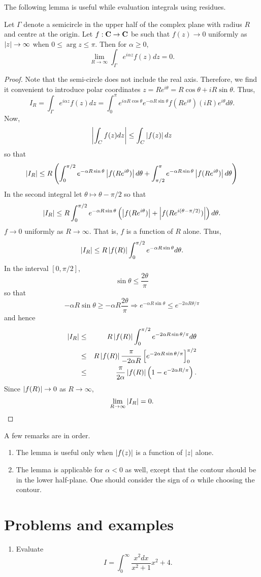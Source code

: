 The following lemma is useful while evaluation integrals using residues.
\begin{lem}\label{c5s3l1}
Let $\Gamma$ denote a semicircle in the upper half of the complex plane with
radius $R$ and centre at the origin. Let $f:\mathbf{C} \rightarrow \mathbf{C}$ be such that
$f(z) \rightarrow 0$ uniformly as $\left\vert{z}\right\vert \rightarrow \infty$ when $0 \le \arg{z} 
\le \pi$. Then for $\alpha \ge 0$,
\[
\lim_{R \rightarrow \infty}\int_\Gamma e^{i\alpha z}f(z)dz = 0.
\]
\end{lem}
\begin{proof}
Note that the semi-circle does not include the real axis. Therefore, we find it
convenient to introduce polar coordinates $z = Re^{i\theta} = R\cos\theta + iR
\sin\theta$. Thus,
\[
I_R = \int_\Gamma e^{i\alpha z}f(z)dz = \int_0^\pi e^{i\alpha R\cos\theta}
e^{-\alpha R\sin\theta}f(Re^{i\theta})(iR)e^{i\theta}d\theta.
\]
Now,
\[
\left\vert{\int_C f(z)dz}\right\vert \le \int_C\left\vert{f(z)}\right\vert dz
\]
so that
\[
\left\vert{I_R}\right\vert \le R\left(
\int_0^{\pi/2} e^{-\alpha R\sin\theta}\left\vert{f(Re^{i\theta})}\right\vert d\theta + 
\int_{\pi/2}^\pi e^{-\alpha R\sin\theta}\left\vert{f(Re^{i\theta})}\right\vert d\theta\right)
\] 
In the second integral let $\theta \mapsto \theta - \pi/2$ so that
\[
\left\vert{I_R}\right\vert \le R\int_0^{\pi/2} e^{-\alpha R\sin\theta}\left(\left\vert{f(Re^{i\theta})}\right\vert
+ \left\vert{f(Re^{i(\theta-\pi/2)})}\right\vert\right)d\theta.
\]
$f \rightarrow 0$ uniformly as $R \rightarrow \infty$. That is, $f$ is a 
function of $R$ alone. Thus,
\[
\left\vert{I_R}\right\vert \le R\left\vert{f(R)}\right\vert \int_0^{\pi/2} e^{-\alpha R\sin\theta} d\theta.
\]
In the interval $[0, \pi/2]$, 
\[
\sin\theta \le \frac{2\theta}{\pi}
\]
so that 
\[
-\alpha R\sin\theta \ge -\alpha R \frac{2\theta}{\pi} \Rightarrow
e^{-\alpha R\sin\theta} \le e^{-2\alpha R\theta/\pi}
\]
and hence
\begin{eqnarray*}
\left\vert{I_R}\right\vert &\le& R\left\vert{f(R)}\right\vert \int_0^{\pi/2} e^{-2\alpha R\sin\theta/\pi} d\theta \\
&\le& R\left\vert{f(R)}\right\vert\frac{\pi}{-2\alpha R} \left[e^{-2\alpha R\sin\theta/\pi}\right]_0^{\pi/2} \\
&\le& \frac{\pi}{2\alpha}\left\vert{f(R)}\right\vert\left(1 - e^{-2\alpha R/\pi}\right).
\end{eqnarray*}
Since $\left\vert{f(R)}\right\vert \rightarrow 0$ as $R \rightarrow \infty$,
\[
\lim_{R \rightarrow \infty}\left\vert{I_R}\right\vert = 0.
\]
\end{proof}

A few remarks are in order.
\begin{enumerate}
\item The lemma is useful only when $\left\vert{f(z)}\right\vert$ is a function of $\left\vert{z}\right\vert$ alone.
\item The lemma is applicable for $\alpha < 0$ as well, except that the contour
should be in the lower half-plane. One should consider the sign of $\alpha$ while
choosing the contour.
\end{enumerate}

\section{Problems and examples}\label{c5s4}
\begin{enumerate}
\item Evaluate
\[
I = \int_0^\infty \frac{x^2dx}{x^2 + 1}{x^2 + 4}.
\]
\end{enumerate}
 
